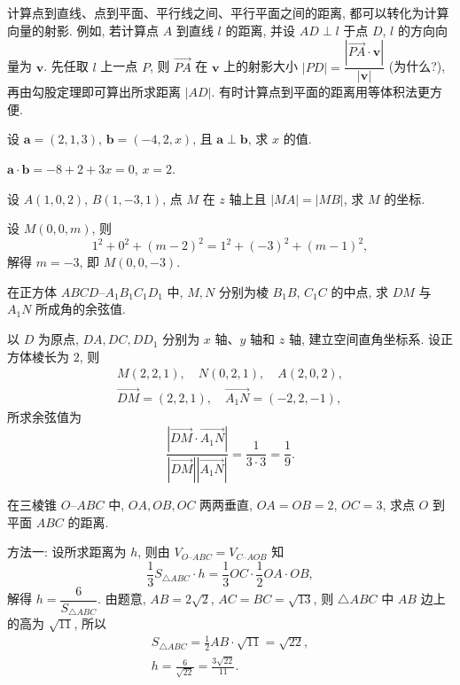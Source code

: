 计算点到直线、点到平面、平行线之间、平行平面之间的距离, 都可以转化为计算向量的射影. 例如, 若计算点 $A$ 到直线 $l$ 的距离, 并设 $AD\perp l$ 于点 $D$, $l$ 的方向向量为 $\bm{v}$. 先任取 $l$ 上一点 $P$, 则 $\overrightarrow{PA}$ 在 $\bm{v}$ 上的射影大小 $|PD|= \dfrac{|\overrightarrow{PA}\cdot\bm{v}|}{|\bm{v}|}$ (为什么?), 再由勾股定理即可算出所求距离 $|AD|$. 有时计算点到平面的距离用等体积法更方便.

\lianxi
\begin{exercise}
    设 $\bm{a}= (2,1,3)$, $\bm{b}= (-4,2,x)$, 且 $\bm{a}\perp \bm{b}$, 求 $x$ 的值.
\end{exercise}
\beginsolution
    $\bm{a}\cdot \bm{b}= -8+2+3x=0$, $x=2$.
\endsolution

\begin{exercise}
    设 $A(1,0,2)$, $B(1,-3,1)$, 点 $M$ 在 $z$ 轴上且 $|MA|= |MB|$, 求 $M$ 的坐标.
\end{exercise}
\beginsolution
    设 $M(0,0,m)$, 则
    \[1^2+0^2+(m-2)^2= 1^2+(-3)^2+(m-1)^2,\]
    解得 $m=-3$, 即 $M(0,0,-3)$.
\endsolution
    
\begin{exercise}
    在正方体 $ABCD\text{--}A_1B_1C_1D_1$ 中, $M, N$ 分别为棱 $B_1B$, $C_1C$ 的中点, 求 $DM$ 与 $A_1N$ 所成角的余弦值.
\end{exercise}
\beginsolution
    以 $D$ 为原点, $DA, DC, DD_1$ 分别为 $x$ 轴、$y$ 轴和 $z$ 轴, 建立空间直角坐标系. 设正方体棱长为 $2$, 则
    \[\begin{gathered}
        M(2,2,1),\quad N(0,2,1),\quad A(2,0,2),\\
        \overrightarrow{DM}= (2,2,1),\quad
        \overrightarrow{A_1N}= (-2,2,-1),
    \end{gathered}\]
    所求余弦值为
    \[\frac{|\overrightarrow{DM}\cdot\overrightarrow{A_1N}|}{|\overrightarrow{DM}||\overrightarrow{A_1N}|}
    = \frac{1}{3\cdot 3}= \frac19.\]
\endsolution

\begin{exercise}
    在三棱锥 $O\text{--}ABC$ 中, $OA, OB, OC$ 两两垂直, $OA=OB= 2$, $OC=3$, 求点 $O$ 到平面 $ABC$ 的距离.
\end{exercise}
\beginsolution
    方法一: 设所求距离为 $h$, 则由 $V_{O\text{--}ABC}= V_{C\text{--}AOB}$ 知
    \[\frac13 S_{\triangle ABC}\cdot h
    = \frac13 OC\cdot \frac12 OA\cdot OB,\]
    解得 $h= \dfrac6{S_{\triangle ABC}}$. 由题意, $AB=2\sqrt2$, $AC=BC=\sqrt{13}$, 则 $\triangle ABC$ 中 $AB$ 边上的高为 $\sqrt{11}$, 所以
    \[\begin{gathered}
        S_{\triangle ABC}= \frac12 AB\cdot \sqrt{11}= \sqrt{22},\\
        h= \frac{6}{\sqrt{22}}= \frac{3\sqrt{22}}{11}.
    \end{gathered}\]

